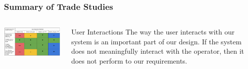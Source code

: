 \documentclass[aspectratio=169]{beamer}
\begin{document}
\begin{frame}
    \frametitle{Summary of Trade Studies}

    \begin{columns}
        \begin{column}{0.70\textwidth}
            \includegraphics[width=10.5cm]{UserInteractionTradeStudy}
        \end{column}

        \begin{column}{0.28\textwidth}
            \begin{block}{User Interactions}
                The way the user interacts with our system is an important
                part of our design. If the system does not meaningfully
                interact with the operator, then it does not perform
                to our requirements.
            \end{block}
        \end{column}
    \end{columns}

\end{frame}
\end{document}
